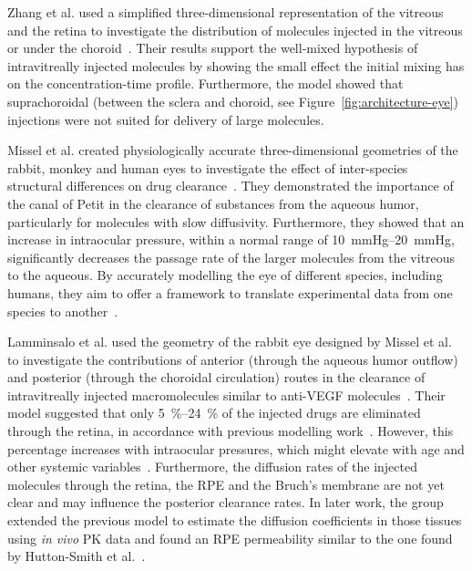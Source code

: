\documentclass{article}
\begin{document}
Zhang et al. used a simplified three-dimensional representation of the vitreous and the retina to investigate the distribution of molecules injected in the vitreous or under the choroid~\cite{Zhang_2018}.
Their results support the well-mixed hypothesis of intravitreally injected molecules by showing the small effect the initial mixing has on the concentration-time profile.
Furthermore, the model showed that suprachoroidal (between the sclera and choroid, see Figure~\ref{fig:architecture-eye}) injections were not suited for delivery of large molecules.

Missel et al. created physiologically accurate three-dimensional geometries of the rabbit, monkey and human eyes to investigate the effect of inter-species structural differences on drug clearance~\cite{Missel_2012}.  
They demonstrated the importance of the canal of Petit in the clearance of substances from the aqueous humor, particularly for molecules with slow diffusivity. 
Furthermore, they showed that an increase in intraocular pressure, within a normal range of \SIrange[range-units = single]{10}{20}{\mmHg}, significantly decreases the passage rate of the larger molecules from the vitreous to the aqueous.
By accurately modelling the eye of different species, including humans, they aim to offer a framework to translate experimental data from one species to another~\cite{Missel_2012}.

Lamminsalo et al. used the geometry of the rabbit eye designed by Missel et al. to investigate the contributions of anterior (through the aqueous humor outflow) and posterior (through the choroidal circulation) routes in the clearance of intravitreally injected macromolecules similar to anti-VEGF molecules~\cite{Lamminsalo_2018}.
Their model suggested that only \SIrange[range-units = single]{5}{24}{\percent} of the injected drugs are eliminated through the retina, in accordance with previous modelling work~\cite{HuttonSmith_2017}.
However, this percentage increases with intraocular pressures, which might elevate with age and other systemic variables~\cite{Armaly_1967,Hashemi_2005}.
Furthermore, the diffusion rates of the injected molecules through the retina, the RPE and the Bruch's membrane are not yet clear and may influence the posterior clearance rates.
In later work, the group extended the previous model to estimate the diffusion coefficients in those tissues using \textit{in vivo} PK data and found an RPE permeability similar to the one found by Hutton-Smith et al.~\cite{Lamminsalo_2020,HuttonSmith_2017}.
\end{document}
